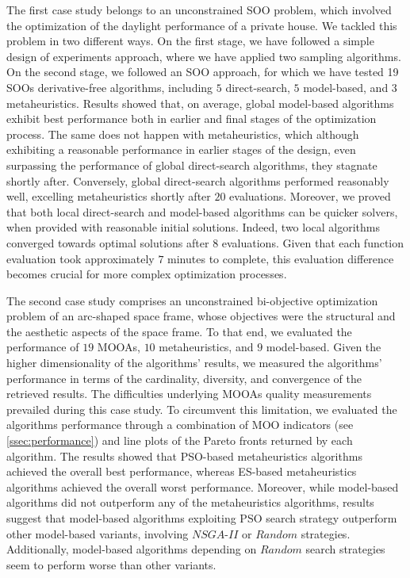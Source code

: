 The first case study belongs to an unconstrained \ac{SOO} problem, which involved the optimization of the daylight performance of a private house. We tackled this problem in two different ways. On the first stage, we have followed a simple design of experiments approach, where we have applied two sampling algorithms. On the second stage, we followed an \ac{SOO} approach, for which we have tested 19 \acp{SOO} derivative-free algorithms, including $5$ direct-search, $5$ model-based, and $3$ metaheuristics. Results showed that, on average, global model-based algorithms exhibit best performance both in earlier and final stages of the optimization process. The same does not happen with metaheuristics, which although exhibiting a reasonable performance in earlier stages of the design, even surpassing the performance of global direct-search algorithms, they stagnate shortly after. Conversely, global direct-search algorithms performed reasonably well, excelling metaheuristics shortly after $20$ evaluations. Moreover, we proved that both local direct-search and model-based algorithms can be quicker solvers, when provided with reasonable initial solutions. Indeed, two local algorithms converged towards optimal solutions after $8$ evaluations. Given that each function evaluation took approximately $7$ minutes to complete, this evaluation difference becomes crucial for more complex optimization processes.

The second case study comprises an unconstrained bi-objective optimization problem of an arc-shaped space frame, whose objectives were the structural and the aesthetic aspects of the space frame. To that end, we evaluated the performance of $19$ \acp{MOOA}, $10$ metaheuristics, and $9$ model-based. Given the higher dimensionality of the algorithms' results, we measured the algorithms' performance in terms of the cardinality, diversity, and convergence of the retrieved results. The difficulties underlying \acp{MOOA} quality measurements prevailed during this case study. To circumvent this limitation, we evaluated the algorithms performance through a combination of \ac{MOO} indicators (see \cref{ssec:performance}) and line plots of the Pareto fronts returned by each algorithm. The results showed that \ac{PSO}-based metaheuristics algorithms achieved the overall best performance, whereas \ac{ES}-based metaheuristics algorithms achieved the overall worst performance. Moreover, while model-based algorithms did not outperform any of the metaheuristics algorithms, results suggest that model-based algorithms exploiting \ac{PSO} search strategy outperform other model-based variants, involving $NSGA$-$II$ or $Random$ strategies. Additionally, model-based algorithms depending on $Random$ search strategies seem to perform worse than other variants. 

